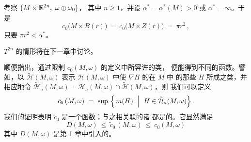 \begin{theorem}\label{thm:product-capacity}
考察\trSymplecticManifold{} $\bigl(M\times\R^{2n},\ \omega\oplus\omega_{0}\bigr)$，%
其中 $n\geq1$，并设 $\alpha^{*}=\alpha^{*}(M)>0$ 或 $\alpha^{*}=\infty$。于是
\[
c_{0}\bigl(M\times B(r)\bigr)\ =\ c_{0}\bigl(M\times Z(r)\bigr)\ =\ \pi r^{2}\,,
\]
只要 $\pi r^{2}<\alpha^{*}$。
\end{theorem}

\trSymplectic\trTorus{} $T^{2n}$ 的情形将在下一章中讨论。

顺便指出，通过限制 $c_{0}(M,\omega)$ 的定义中所容许的\trHamiltonianFunction{}类，%
便能得到不同的\trCapacity{}函数。譬如，以 $\widetilde{\mathcal{H}}(M,\omega)$%
表示 $\mathcal{H}(M,\omega)$ 中使 $\nabla H$ 的\trSupport{}在 $M$ 中%
\trContractible{}的那些 $H$ 所成之类，并相应地令 $\widetilde{\mathcal{H}}_{a}%
(M,\omega)=\mathcal{H}_{a}(M,\omega)\cap\widetilde{\mathcal{H}}(M,\omega)$，则%
我们可以定义
\[
\tilde{c}_{0}\,(M,\omega)\ =\ \sup\ \Bigl\{\,m(H)\ \Bigm|\ H\in\widetilde{\mathcal{H}}_{a}(M,\omega)\Bigr\}\,.
\]
我们的证明表明 $\tilde{c}_{0}$ 是一个\trCapacity{}函数；与之相关联的诸%
\trPeriodicSolution{}都是\trContractible{}的。它显然满足
\[
D(M,\omega)\ \leq\ \tilde{c}_{0}\,(M,\omega)\ \leq\ c_{0}(M,\omega)
\]
其中 $D(M,\omega)$ 是第 1 章中引入的\trGromovWidth。
